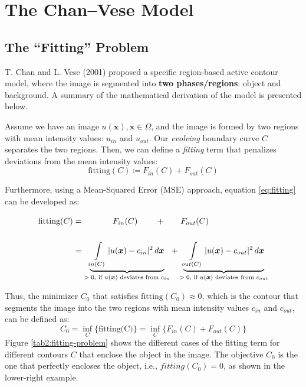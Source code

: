 \documentclass[journal]{IEEEtran}
\begin{document}
\section{The Chan--Vese Model}

\subsection{The ``Fitting'' Problem}
T. Chan and L. Vese (2001) proposed a specific region-based active contour model, where the image is segmented into \textbf{two phases/regions}: object and background. A summary of the mathematical derivation of the model is presented below.

Assume we have an image \( u({\bm{x}}), \bm{x} \in \Omega \), and the image is formed by two regions with mean intensity values: \( u_{in} \) and \( u_{out} \). Our \textit{evolving} boundary curve \( C \) separates the two regions. Then, we can define a \emph{fitting} term that penalizes deviations from the mean intensity values:
\begin{equation}\label{eq:fitting}
    \textrm{fitting}(C) \coloneq F_{in}(C) + F_{out}(C)
\end{equation}

Furthermore, using a Mean-Squared Error (MSE) approach, equation \eqref{eq:fitting} can be developed as:
\begin{align*}
    \textrm{fitting}(C) & = \phantom{\int\limits_{inside(C)}} F_{in}(C) \phantom{\int\limits_{out(C)}} \color{black}{+} \phantom{\int\limits_{in(C)}} F_{out}(C) \phantom{\int\limits_{out(C)}}                                                                                                              \\
                        & = \underbrace{\int\limits_{\scriptstyle in(C)} |u(\bm{x}) - c_{in}|^2 \, d\bm{x}}_{\text{$> 0$, if $u(\bm{x})$ deviates from $c_{in}$}} + \underbrace{\int\limits_{\scriptstyle out(C)} |u(\bm{x}) - c_{out}|^2 \, d\bm{x}}_{\text{$> 0$, if $u(\bm{x})$ deviates from $c_{out}$}}
\end{align*}

Thus, the minimizer $C_0$ that satisfies \(\textrm{fitting}(C_0) \approx 0\), which is the contour that segments the image into the two regions with mean intensity values \(c_{in}\) and \(c_{out}\), can be defined as:
\begin{equation}\label{eq:minimization}
    C_0 = \inf_C \{\textrm{fitting(C)}\} = \inf_C \{F_{in}(C) + F_{out}(C)\}
\end{equation}
Figure \ref{tab2:fitting-problem} shows the different cases of the fitting term for different contours \( C \) that enclose the object in the image. The objective $C_0$ is the one that perfectly encloses the object, i.e., $fitting(C_0) = 0$, as shown in the lower-right example.
\end{document}
